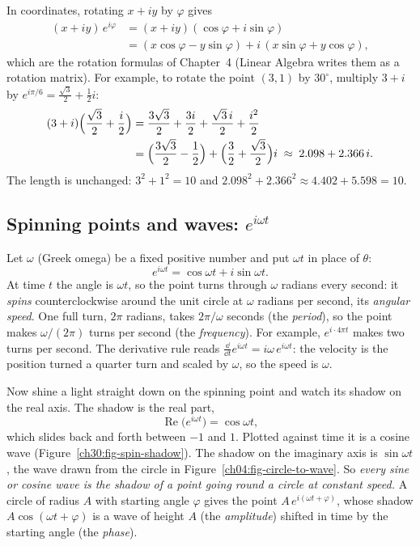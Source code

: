 In coordinates, rotating $x + iy$ by $\varphi$ gives
\begin{align*}
  (x + iy)\,e^{i\varphi} &= (x + iy)(\cos\varphi + i\sin\varphi)\\
  &= (x\cos\varphi - y\sin\varphi) + i\,(x\sin\varphi + y\cos\varphi),
\end{align*}
which are the rotation formulas of Chapter~4 (Linear Algebra writes them as a rotation matrix). For example, to rotate the point $(3, 1)$ by $30^\circ$, multiply $3 + i$ by $e^{i\pi/6} = \frac{\sqrt3}{2} + \frac{1}{2}i$:
\begin{align*}
  (3 + i)\Bigl(\frac{\sqrt3}{2} + \frac{i}{2}\Bigr)
  &= \frac{3\sqrt3}{2} + \frac{3i}{2} + \frac{\sqrt3\,i}{2} + \frac{i^2}{2}\\
  &= \Bigl(\frac{3\sqrt3}{2} - \frac12\Bigr) + \Bigl(\frac32 + \frac{\sqrt3}{2}\Bigr)i
   \;\approx\; 2.098 + 2.366\,i.
\end{align*}
The length is unchanged: $3^2 + 1^2 = 10$ and $2.098^2 + 2.366^2 \approx 4.402 + 5.598 = 10$.

\subsection{\texorpdfstring{Spinning points and waves: $e^{i\omega t}$}{Spinning points and waves: e to the i omega t}}
\label{ch30:sec-euler-spin}

Let $\omega$ (Greek omega) be a fixed positive number and put $\omega t$ in place of $\theta$:
\[
  e^{i\omega t} = \cos\omega t + i\sin\omega t.
\]
At time $t$ the angle is $\omega t$, so the point turns through $\omega$ radians every second: it \emph{spins} counterclockwise around the unit circle at $\omega$ radians per second, its \emph{angular speed}. One full turn, $2\pi$ radians, takes $2\pi/\omega$ seconds (the \emph{period}), so the point makes $\omega/(2\pi)$ turns per second (the \emph{frequency}). For example, $e^{i\cdot 4\pi t}$ makes two turns per second. The derivative rule reads $\frac{\dd}{\dd t}e^{i\omega t} = i\omega\, e^{i\omega t}$: the velocity is the position turned a quarter turn and scaled by $\omega$, so the speed is $\omega$.

Now shine a light straight down on the spinning point and watch its shadow on the real axis. The shadow is the real part,
\[
  \operatorname{Re}\bigl(e^{i\omega t}\bigr) = \cos\omega t,
\]
which slides back and forth between $-1$ and $1$. Plotted against time it is a cosine wave (Figure~\ref{ch30:fig-spin-shadow}). The shadow on the imaginary axis is $\sin\omega t$, the wave drawn from the circle in Figure~\ref{ch04:fig-circle-to-wave}. So \emph{every sine or cosine wave is the shadow of a point going round a circle at constant speed.} A circle of radius $A$ with starting angle $\varphi$ gives the point $A\,e^{i(\omega t + \varphi)}$, whose shadow $A\cos(\omega t + \varphi)$ is a wave of height $A$ (the \emph{amplitude}) shifted in time by the starting angle (the \emph{phase}).

